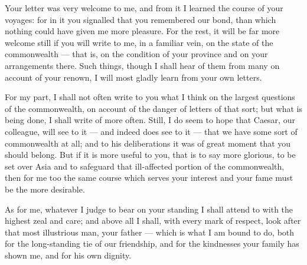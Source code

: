 

 Your letter was very welcome to me, and from it I learned the course of your voyages: for in it you signalled that you remembered our bond, than which nothing could have given me more pleasure. For the rest, it will be far more welcome still if you will write to me, in a familiar vein, on the state of the commonwealth --- that is, on the condition of your province and on your arrangements there. Such things, though I shall hear of them from many on account of your renown, I will most gladly learn from your own letters.

 For my part, I shall not often write to you what I think on the largest questions of the commonwealth, on account of the danger of letters of that sort; but what is being done, I shall write of more often. Still, I do seem to hope that Caesar, our colleague, will see to it --- and indeed does see to it --- that we have some sort of commonwealth at all; and to his deliberations it was of great moment that you should belong. But if it is more useful to you, that is to say more glorious, to be set over Asia and to safeguard that ill-affected portion of the commonwealth, then for me too the same course which serves your interest and your fame must be the more desirable.

 As for me, whatever I judge to bear on your standing I shall attend to with the highest zeal and care; and above all I shall, with every mark of respect, look after that most illustrious man, your father --- which is what I am bound to do, both for the long-standing tie of our friendship, and for the kindnesses your family has shown me, and for his own dignity.
